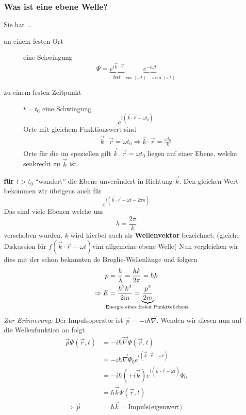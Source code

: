 \subsubsection{Was ist eine ebene Welle?}
Sie hat \dots
\begin{description}
	\item[an einem festen Ort] eine Schwingung 
	$$\Psi = \underbrace{e^{i\vec{k} \cdot \vec{r}}}_{\text{fest}} \underbrace{e^{-i\omega t}}_{\cos(\omega t) - i \sin(\omega t)}$$
	\item[zu einem festen Zeitpunkt] $t = t_0$ eine Schwingung 
	$$e^{i (\vec{k} \cdot \vec{r} - \omega t_0)}$$
	Orte mit gleichem Funktionswert sind
	\begin{align*}
	\vec{k} \cdot \vec{r} = \omega t_0 \Rightarrow \hat{k} \cdot \vec{r} = \frac{\omega t_0}{k}
	\end{align*}
	Orte für die im speziellen gilt $\vec{k} \cdot \vec{r} = \omega t_0$ liegen auf einer Ebene, welche senkrecht zu $\vec{k}$ ist.
\end{description}
\textbf{für $t > t_0$} "`wandert"' die Ebene unverändert in Richtung $\vec{k}$.
Den gleichen Wert bekommen wir übrigens auch für 
$$e^{i(\vec{h} \cdot \vec{r} - \omega t - 2 \pi n)}$$
Das sind viele Ebenen welche um
$$\lambda = \frac{2\pi}{k}$$
verschoben wurden. $k$ wird hierbei auch als \textbf{Wellenvektor} bezeichnet.
(gleiche Diskussion für $f(\vec{k} \cdot \vec{r} - \omega t)$vim allgemeine ebene Welle)
Nun vergleichen wir dies mit der schon bekannten de Broglie-Wellenlänge und folgern
\begin{align*}
p &= \frac{h}{\lambda} = \frac{hk}{2\pi} = \hbar k\\
\Rightarrow E &= \frac{\hbar^2 k^2}{2m} = \underbrace{\frac{p^2}{2m}}_{\hspace{-10em}\text{Energie eines freien Punktteilchens.}\hspace{-10em}}
\end{align*}
\textit{Zur Erinnerung:} Der Impulsoperator ist $\vec{p} = - i \hbar \vec{\nabla}$. Wenden wir diesen nun auf die Wellenfunktion an folgt
\begin{align*}
	\vec{p} \Psi(\vec{r}, t) &= - i \hbar \vec{\nabla} \Psi(\vec{r}, t)\\
	&= -i \hbar \vec{\nabla} \Psi_0 e^{i(\vec{k} \cdot \vec{r} - \omega t)}\\
	&= -i \hbar (+ i \vec{k}) e^{i(\vec{k} \cdot \vec{r} - \omega t)} \Psi_0\\
	&= \hbar \vec{k} \Psi(\vec{r}, t)\\
	\Rightarrow \vec{p} &= \hbar \vec{k} = \text{Impuls(eigenwert)}
\end{align*}

